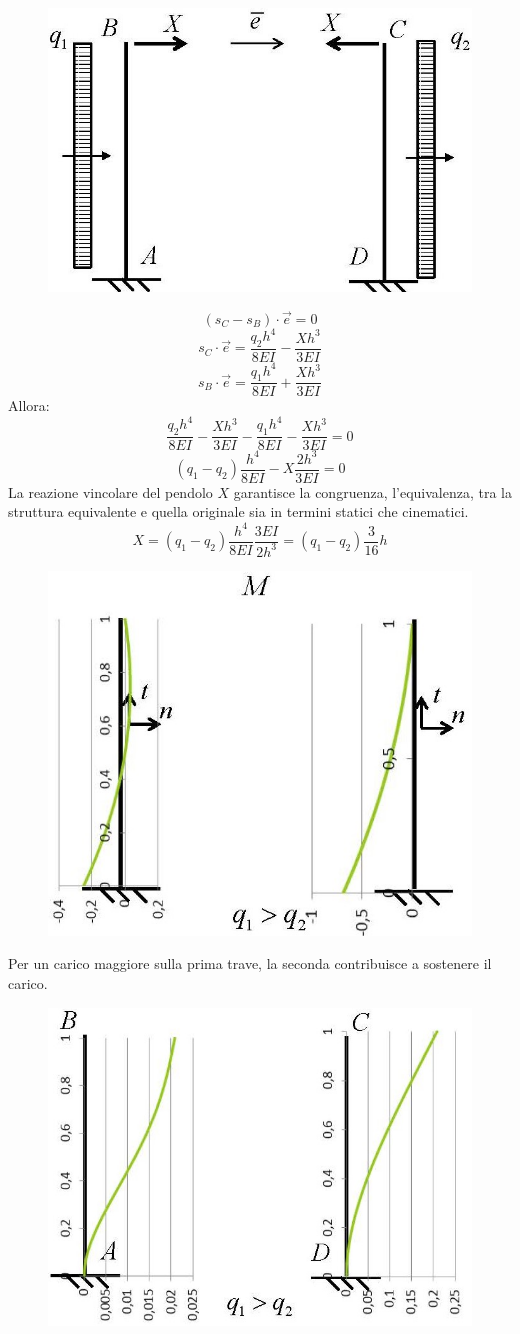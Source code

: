 \documentclass{article}
\begin{document}
\begin{adjustwidth}{2in}{}
\begin{figure}[H]
	\centering
	\includegraphics[width=0.4\linewidth]{"immagini/1.PARTE8_Pagina_52"}	
\end{figure}

		\[ (s_C - s_B)\cdot \vec{e} = 0 \]
		\[ s_C \cdot \vec{e} = \dfrac{q_2h^4}{8EI} - \dfrac{Xh^3}{3EI}\]
		\[ s_B \cdot \vec{e} = \dfrac{q_1h^4}{8EI} + \dfrac{Xh^3}{3EI}\]	
		Allora:
		\[ \dfrac{q_2h^4}{8EI} - \dfrac{Xh^3}{3EI} - \dfrac{q_1h^4}{8EI} - \dfrac{Xh^3}{3EI} = 0 \]	
		\[ (q_1 - q_2)\dfrac{h^4}{8EI} - X\dfrac{2h^3}{3EI} = 0	\]
		La reazione vincolare del pendolo $X$
		garantisce la congruenza, l’equivalenza,
		tra la struttura equivalente e quella originale sia in
		termini statici che cinematici.
		\[ X = (q_1 - q_2)\dfrac{h^4}{8EI}\dfrac{3EI}{2h^3} = (q_1 - q_2)\dfrac{3}{16}h\]

\begin{figure}[H]
	\centering
	\includegraphics[width=0.4\linewidth]{"immagini/1.PARTE8_Pagina_53"}	
\end{figure}

		Per un carico maggiore sulla prima trave, la seconda
		contribuisce a sostenere il carico.
		
\begin{figure}[H]
	\centering
	\includegraphics[width=0.4\linewidth]{"immagini/1.PARTE8_Pagina_54"}	
\end{figure}


\end{adjustwidth}
\end{document}
